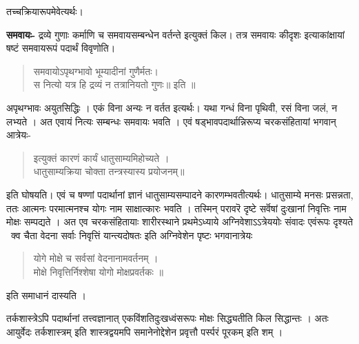 तच्चक्रियारूपमेवेत्यर्थः।

\textbf{समवायः-} द्रव्ये गुणाः कर्माणि च समवायसम्बन्धेन वर्तन्ते इत्युक्तं किल। तत्र समवायः कीदृशः इत्याकांक्षायां षष्टं समवायरूपं पदार्थं विवृणोति।
\begin{verse}
समवायोऽपृथग्भावो भूम्यादीनां गुणैर्मतः।\\
स नित्यो यत्र हि द्रव्यं न तत्रानियतो गुणः॥ इति ॥
\end{verse}
अपृथग्भावः अयुतसिद्धिः । एकं विना अन्यः न वर्तत इत्यर्थः। यथा गन्धं विना पृथिवी, रसं विना जलं, न लभ्यते । अत एवायं नित्यः सम्बन्धः समवायः भवति । एवं षड्भावपदार्थान्निरूप्य चरकसंहितायां भगवान् आत्रेयः-
\begin{verse}
इत्युक्तं कारणं कार्यं धातुसाम्यमिहोच्यते ।\\
धातुसाम्यक्रिया चोक्ता तन्त्रस्यास्य प्रयोजनम्॥
\end{verse}
इति घोषयति। एवं च षण्णां पदार्थानां ज्ञानं धातुसाम्यसम्पादने कारणम्भवतीत्यर्थः। धातुसाम्ये मनसः प्रसन्नता, ततः आत्मनः परमात्मनश्च योगः नाम साक्षात्कारः भवति । तस्मिन् परावरॆ दृष्टे सर्वॆषां दुःखानां निवृत्तिः नाम मोक्षः सम्पद्यते । अत एव चरकसंहितायाः शारीरस्थाने प्रथमेऽध्याये अग्निवेशाऽऽत्रेययोः संवादः एवंरूपः दृश्यते \ क्व चैता वेदना सर्वाः निवृत्तिं यान्त्यदोषतः इति अग्निवेशेन पृष्टः भगवानात्रेयः
\begin{verse}
योगे मोक्षे च सर्वसां वेदनानामवर्तनम् ।\\
मोक्षे निवृत्तिर्निश्शेषा योगो मोक्षप्रवर्तकः ॥
\end{verse}
इति समाधानं दास्यति ।

तर्कशास्त्रेऽपि पदार्थानां तत्त्वज्ञानात् एकविंशतिदुःखध्वंसरूपः मोक्षः सिद्ध्यतीति किल सिद्धान्तः । अतः आयुर्वेदः तर्कशास्त्रम् इति शास्त्रद्वयमपि समानेनोद्देशेन प्रवृत्तौ पर्स्परं पूरकम् इति शम् ।

\articleend
